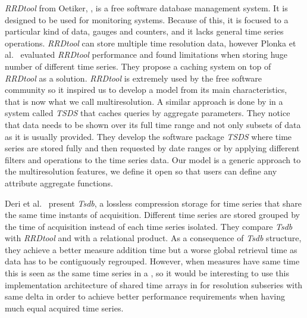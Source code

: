 \emph{RRDtool} from Oetiker, \cite{rrdtool,lisa98:oetiker}, is a free
software database management system. It is designed to be used for
monitoring systems. Because of this, it is focused to a particular
kind of data, gauges and counters, and it lacks general time series
operations. \emph{RRDtool} can store multiple time resolution data,
however Plonka et al.\ \cite{lisa07:plonka} evaluated \emph{RRDtool}
performance and found limitations when storing huge number of
different time series. They propose a caching system on top of
\emph{RRDtool} as a solution.  \emph{RRDtool} is extremely used by the
free software community so it inspired us to develop a model from its
main characteristics, that is now what we call multiresolution. A
similar approach is done by \cite{weigel10} in a system called
\emph{TSDS} that caches queries by aggregate parameters. They notice
that data needs to be shown over its full time range and not only
subsets of data as it is usually provided.  They develop the software
package \emph{TSDS} where time series are stored fully and then
requested by date ranges or by applying different filters and
operations to the time series data.  Our  model is a generic
approach to the multiresolution features, we define it open so that
users can define any attribute aggregate functions.


Deri et al.\ \cite{deri12:tsdb_compressed_database} present
\emph{Tsdb}, a lossless compression storage  for time
series that share the same time instants of acquisition. Different
time series are stored grouped by the time of acquisition instead of
each time series isolated.  They compare \emph{Tsdb} with \emph{RRDtool} and
with a relational product. As a consequence of \emph{Tsdb} structure,
they achieve a better measure addition time but a worse global
retrieval time as data has to be contiguously regrouped. However, when
measures have same time this is seen as the same time series in a
, so it would be interesting to use this implementation
architecture of shared time arrays in  for resolution subseries
with same delta in order to achieve better performance requirements
when having much equal acquired time series.



